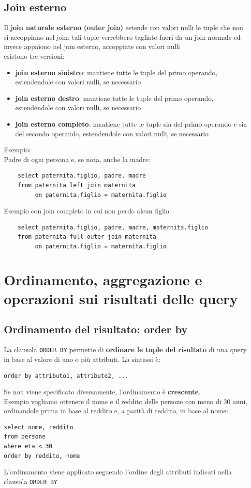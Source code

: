 \newpage \subsection{Join esterno}
Il \textbf{join naturale esterno (outer join)} estende con valori nulli le tuple che non si accoppiano nel join: 
tali tuple verrebbero tagliate fuori da un join normale ed invece appaiono nel join esterno, accoppiate con valori nulli\\
esistono tre versioni:
\begin{itemize}
    \item \textbf{join esterno sinistro}: mantiene tutte le tuple del primo operando, estendendole con valori nulli, se necessario
    \item \textbf{join esterno destro}: mantiene tutte le tuple del primo operando, estendendole con valori nulli, se necessario
    \item \textbf{join esterno completo}: mantiene tutte le tuple sia del primo operando e sia del secondo operando, estendendole con valori nulli, se necessario
\end{itemize}
\noindent \textcolor{verdeEsempio}{Esempio:}\\
Padre di ogni persona e, se nota, anche la madre:
\begin{verbatim}
    select paternita.figlio, padre, madre
    from paternita left join maternita
         on paternita.figlio = maternita.figlio 
\end{verbatim}
\noindent \textcolor{verdeEsempio}{Esempio} con join completo in cui non perdo alcun figlio:
\begin{verbatim}
    select paternita.figlio, padre, madre, maternita.figlio 
    from paternita full outer join maternita 
         on paternita.figlio = maternita.figlio
\end{verbatim}

\section{Ordinamento, aggregazione e operazioni sui risultati delle query}
\subsection{Ordinamento del risultato: order by}
La clausola \texttt{ORDER BY} permette di \textbf{ordinare le tuple del risultato} di una query in base al valore di uno o più attributi.
La sintassi è:
\begin{verbatim}
order by attributo1, attributo2, ...
\end{verbatim}
\noindent Se non viene specificato diversamente, l'ordinamento è \textbf{crescente}.\\
\textcolor{verdeEsempio}{Esempio} vogliamo ottenere il nome e il reddito delle persone con meno di
30 anni, ordinandole prima in base al reddito e, a parità di reddito, in base al nome:
\begin{verbatim}
select nome, reddito
from persone
where eta < 30
order by reddito, nome
\end{verbatim}
\noindent L'ordinamento viene applicato seguendo l'ordine degli attributi indicati nella
clausola \texttt{ORDER BY}

